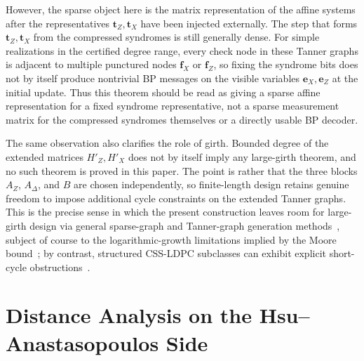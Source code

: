 \documentclass[11pt]{article}
\theoremstyle{definition}
\newcommand{\be}{\mathbf e}
\newcommand{\bt}{\mathbf t}
\newcommand{\bff}{\mathbf f}
\begin{document}
However, the sparse object here is the matrix representation of the affine systems after the representatives \(\bt_Z,\bt_X\) have been injected externally. The step that forms \(\bt_Z,\bt_X\) from the compressed syndromes is still generally dense. For simple realizations in the certified degree range, every check node in these Tanner graphs is adjacent to multiple punctured nodes \(\bff_X\) or \(\bff_Z\), so fixing the syndrome bits does not by itself produce nontrivial BP messages on the visible variables \(\be_X,\be_Z\) at the initial update. Thus this theorem should be read as giving a sparse affine representation for a fixed syndrome representative, not a sparse measurement matrix for the compressed syndromes themselves or a directly usable BP decoder.

The same observation also clarifies the role of girth. Bounded degree of the extended matrices \(H'_Z,H'_X\) does not by itself imply any large-girth theorem, and no such theorem is proved in this paper. The point is rather that the three blocks \(A_Z\), \(A_\Delta\), and \(B\) are chosen independently, so finite-length design retains genuine freedom to impose additional cycle constraints on the extended Tanner graphs. This is the precise sense in which the present construction leaves room for large-girth design via general sparse-graph and Tanner-graph generation methods~\cite{BayatiMS09,BayatiKMOS09}, subject of course to the logarithmic-growth limitations implied by the Moore bound~\cite{AlonHL02}; by contrast, structured CSS-LDPC subclasses can exhibit explicit short-cycle obstructions~\cite{AmirzadePS24}.

\section{Distance Analysis on the Hsu--Anastasopoulos Side}
\end{document}
